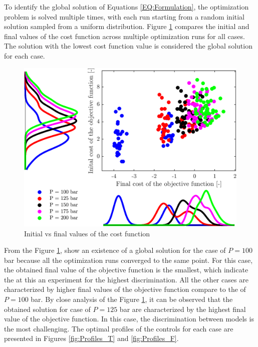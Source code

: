 \documentclass[../Article_Sensitivity_Analsysis.tex]{subfiles}
\begin{document}
	
	\label{CH: Results}
	
	To identify the global solution of Equations \ref{EQ:Formulation}, the optimization problem is solved multiple times, with each run starting from a random initial solution sampled from a uniform distribution. Figure \ref{fig:scatter} compares the initial and final values of the cost function across multiple optimization runs for all cases. The solution with the lowest cost function value is considered the global solution for each case.
	
	\begin{figure}[h!]
		\centering
		\includegraphics[width=\columnwidth]{Figures/Results/scatter.png}	
		\caption{Initial vs final values of the cost function}
		\label{fig:scatter}
	\end{figure}
	
	From the Figure \ref{fig:scatter}, show an existence of a global solution for the case of $P=100$ bar because all the optimization runs converged to the same point. For this case, the obtained final value of the objective function is the smallest, which indicate the at this an experiment for the highest discrimination. All the other cases are characterized by higher final values of the objective function compare to the of $P=100$ bar. By close analysis of the Figure \ref{fig:scatter}, it can be observed that the obtained solution for case of $P=125$ bar are characterized by the highest final value of the objective function. In this case, the discrimination between models is the most challenging. The optimal profiles of the controls for each case are presented in Figures  \ref{fig:Profiles_T} and \ref{fig:Profiles_F}.
	
\end{document}
